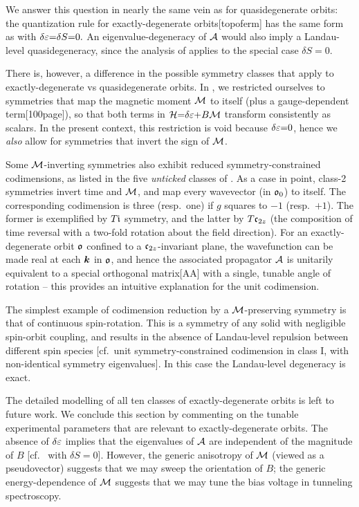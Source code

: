 \documentclass[aps, prb, showpacs, twocolumn, notitlepage, superscriptaddress]{revtex4-1}
\begin{document}
We answer this question in nearly the same vein as for quasidegenerate orbits: the quantization rule for exactly-degenerate orbits[topoferm] has the same form as  with $\delta \varepsilon{=}\delta S{=}0.$ An eigenvalue-degeneracy of ${\cal A}$ would also imply a Landau-level quasidegeneracy, since the analysis of  applies to the special case $\delta S{=}0$. 

There is, however, a difference in the possible symmetry classes that apply to exactly-degenerate vs quasidegenerate orbits.  In , we restricted ourselves to symmetries  that map the magnetic moment  ${\cal M}$ to itself (plus a gauge-dependent term[100page]), so that both terms in ${\cal H}{=}\delta \varepsilon{+}B{\cal M}$ transform consistently as scalars. In the present context, this restriction is void because $\delta\varepsilon{=}0$, hence we \textit{also} allow for symmetries that invert the sign of ${\cal M}$. 

Some ${\cal M}$-inverting symmetries also exhibit reduced symmetry-constrained codimensions, as listed in the five \textit{unticked} classes of . As a case in point, class-2 symmetries invert time and ${\cal M}$, and map  every wavevector (in $\mathfrak{o}_0$) to itself. The corresponding codimension is three (resp.\ one) if $g$ squares to $-1$ (resp.\ $+1$). The former is exemplified by $T\mathfrak{i}$ symmetry, and the latter by $T\mathfrak{c}_{2z}$ (the composition of time reversal with a two-fold rotation about the field direction). For an exactly-degenerate orbit $\mathfrak{o}$ confined to a $\mathfrak{c}_{2z}$-invariant plane, the wavefunction can be made real at each $\boldsymbol{k}$ in $\mathfrak{o}$, and hence the associated propagator ${\cal A}$ is unitarily equivalent to a special orthogonal matrix[AA] with a single, tunable angle of rotation -- this provides an intuitive explanation for the unit codimension.


The simplest example of codimension reduction by a ${\cal M}$-preserving symmetry is that of continuous spin-rotation. This is a symmetry of any solid with negligible spin-orbit coupling, and results in the absence of Landau-level repulsion between different spin species [cf.\ unit symmetry-constrained codimension in class I, with non-identical symmetry eigenvalues]. In this case the Landau-level degeneracy is exact.  

The detailed modelling of all ten classes of exactly-degenerate orbits is left to future work. We conclude this section by commenting on the tunable experimental parameters that are relevant to exactly-degenerate orbits. The absence of $\delta\varepsilon$  implies that the eigenvalues of ${\cal A}$ are independent of the magnitude of $B$ [cf.\  with $\delta S{=}0$]. However, the generic anisotropy of ${\cal M}$ (viewed as a pseudovector) suggests that we may sweep the orientation of $B$; the generic energy-dependence of ${\cal M}$ suggests that we may tune the bias voltage in tunneling spectroscopy.
\end{document}
